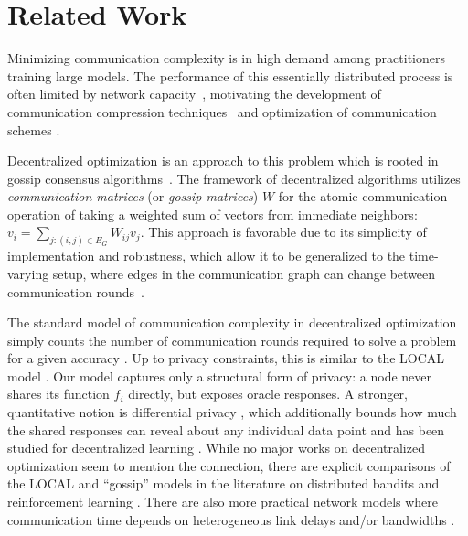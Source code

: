 \documentclass[a4paper,USenglish,cleveref, autoref, thm-restate]{lipics-v2021}
\begin{document}
\section{Related Work}
Minimizing communication complexity is in high demand among practitioners training large models.
The performance of this essentially distributed process is often limited by network capacity~\cite{lian2017can}, motivating the development of communication compression techniques~\cite{seide20141,richtarik2021ef21,beznosikov2023biased} and optimization of communication schemes \cite{boyd2004fastest,lakhotia2022polarfly,liao2025ub,ying2021exponential}.

Decentralized optimization is an approach to this problem which is rooted in gossip consensus algorithms~\cite{nedic2009distributed,nedic2010constrained,gorbunov2022recent}. 
The framework of {decentralized algorithms} utilizes \textit{communication matrices} (or \textit{gossip matrices}) $W$  
for the atomic communication operation of taking a weighted sum of vectors from immediate neighbors: $v_i = \sum_{j: (i, j) \in E_G} W_{ij} v_j$. 
This approach is favorable due to its simplicity of implementation and robustness, which allow it to be generalized to the time-varying setup, where edges in the communication graph can change between communication rounds~\cite{kovalev2021lower,metelev2023consensus,ryabinin2021moshpit}.

The standard model of communication complexity in decentralized optimization simply counts the number of communication rounds required to solve a problem for a given accuracy \cite{gorbunov2022recent,ye2023multi,scaman2017optimal}.
Up to privacy constraints, this is similar to the LOCAL model \cite{linial1992locality,rozhon2024local}.
Our model captures only a structural form of privacy: a node never shares its function $f_i$ directly, but exposes oracle responses. A stronger, quantitative notion is differential privacy \cite{dwork2006calibrating,dwork2014algorithmic}, which additionally bounds how much the shared responses can reveal about any individual data point and has been studied for decentralized learning \cite{allouah2024privacy}.
While no major works on decentralized optimization seem to mention the connection, there are explicit comparisons of the LOCAL and ``gossip'' models in the literature on distributed bandits and reinforcement learning \cite{dubey2020kernel,shihab2026locality,lazarsfeld2023simple}.
There are also more practical network models where communication time depends on heterogeneous link delays and/or bandwidths \cite{marfoq2020throughput,tyurin2026optimality}.
\end{document}

